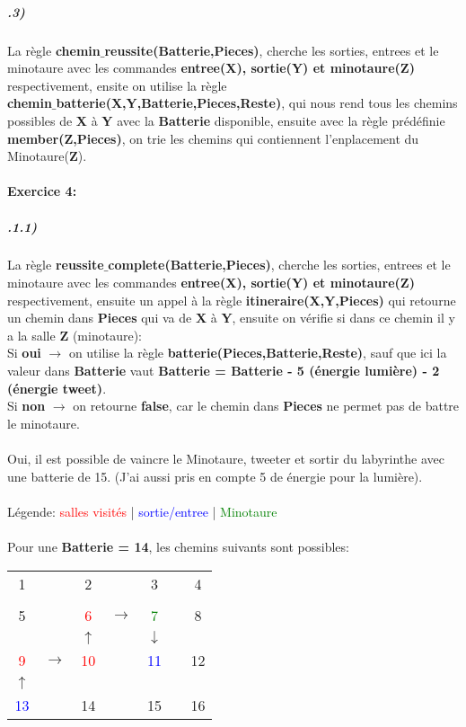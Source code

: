 \documentclass[12pt]
{report}
\newcommand\tab[1][1cm]{\hspace*{#1}}
\begin{document}
\subparagraph*{\textbf{.3)}}La règle \textbf{chemin$\_$reussite(Batterie,Pieces)}, cherche les sorties, entrees et le minotaure avec les commandes \textbf{entree(X), sortie(Y) et minotaure(Z)} respectivement, ensite on utilise la règle \\ \textbf{chemin$\_$batterie(X,Y,Batterie,Pieces,Reste)}, qui nous rend tous les chemins possibles de \textbf{X} à \textbf{Y} avec la \textbf{Batterie} disponible, ensuite avec la règle prédéfinie \textbf{member(Z,Pieces)}, on trie les chemins qui contiennent l'enplacement du Minotaure(\textbf{Z}).


\paragraph*{\textbf{Exercice 4:}}
\subparagraph*{\textbf{.1.1)}} La règle \textbf{reussite$\_$complete(Batterie,Pieces)}, cherche les sorties, entrees et le minotaure avec les commandes \textbf{entree(X), sortie(Y) et minotaure(Z)} respectivement, ensuite un appel à la règle \textbf{itineraire(X,Y,Pieces)} qui retourne un chemin dans \textbf{Pieces} qui va de \textbf{X} à \textbf{Y}, ensuite on vérifie si dans ce chemin il y a la salle \textbf{Z} (minotaure):
\\ \tab Si \textbf{oui} $\rightarrow$ on utilise la règle \textbf{batterie(Pieces,Batterie,Reste)}, sauf que ici la valeur dans \textbf{Batterie} vaut \textbf{Batterie = Batterie - 5 (énergie lumière) - 2 (énergie tweet)}.
\\ \tab Si \textbf{non} $\rightarrow$ on retourne \textbf{false}, car le chemin dans \textbf{Pieces} ne permet pas de battre le minotaure.
\\ \\ \tab Oui, il est possible de vaincre le Minotaure, tweeter et sortir du labyrinthe avec une batterie de 15. (J'ai aussi pris en compte 5 de énergie pour la lumière).
\\ \\ \tab Légende: \textcolor{red}{salles visités} | \textcolor{blue}{sortie/entree} | \textcolor{green}{Minotaure}
\\ \\ \tab Pour une \textbf{Batterie = 14}, les chemins suivants sont possibles:

\begin{center}

\begin{tabular}{|ccccccc|}
\hline
1 & & 2 & & 3 & & 4 \\
&&&&&& \\
5 & & \textcolor{red}{6} &$\rightarrow$& \textcolor{green}{7} & & 8 \\
&&$\uparrow$&&$\downarrow$&& \\
\textcolor{red}{9} &$\rightarrow$& \textcolor{red}{10} & & \textcolor{blue}{11} & & 12 \\
$\uparrow$&&&&&& \\
\textcolor{blue}{13} & & 14 & & 15 & & 16 \\
\hline
\end{tabular}
\end{center}
\end{document}
